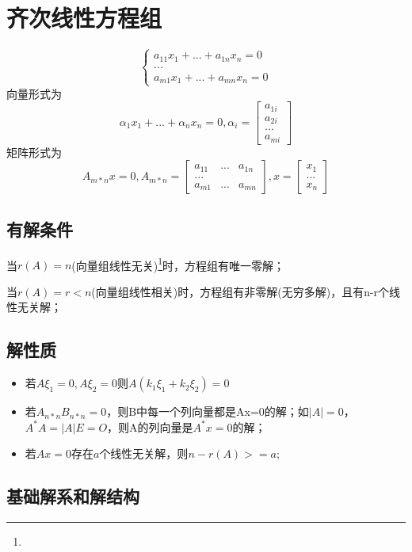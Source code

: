 \section{齐次线性方程组}
\[\begin{cases}
    a_{11}x_1 + ... + a_{1n}x_n = 0 \\ 
    ... \\ 
    a_{m1}x_1 + ... + a_{mn}x_n = 0
\end{cases}\]
向量形式为\[\alpha_1x_1 + ... + \alpha_nx_n = 0, \alpha_i = \begin{bmatrix}
    a_{1i} \\ 
    a_{2i} \\
    ... \\ 
    a_{mi}
\end{bmatrix}\]
矩阵形式为
\[A_{m*n}x = 0, A_{m*n} = \begin{bmatrix}
    a_{11} & ... & a_{1n} \\ 
    ... \\ 
    a_{m1} & ... & a_{mn}
\end{bmatrix}, x = \begin{bmatrix}
    x_1 \\ 
    ... \\ 
    x_n
\end{bmatrix}\]

\subsection{有解条件}
当\(r(A) = n\)(向量组线性无关)\footnote{\mymatrix}时，方程组有唯一零解；

当\(r(A) = r < n\)(向量组线性相关)时，方程组有非零解(无穷多解)，且有n-r个线性无关解；


\subsection{解性质}
\begin{itemize}
    \item 若\(A\xi_1 = 0, A\xi_2 = 0\)则\(A(k_1\xi_1 + k_2\xi_2) = 0\)
    \item 若\(A_{n*n}B_{n*n} = 0\)，则B中每一个列向量都是Ax=0的解；如\(|A| = 0\)，\(A^*A = |A|E = O\)，则A的列向量是\(A^*x = 0\)的解；
    \item 若\(Ax = 0\)存在\(a\)个线性无关解，则\(n - r(A) >= a\);
\end{itemize}


\subsection{基础解系和解结构}
